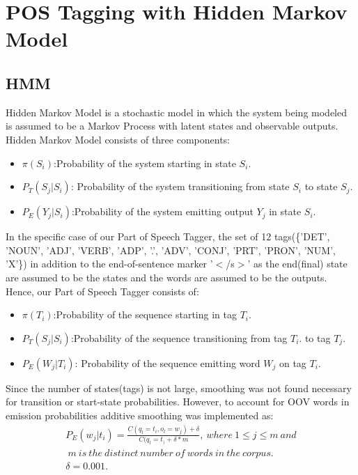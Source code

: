 \documentclass[12pt]{article}
\begin{document}
\section{POS Tagging with Hidden Markov Model}

\subsection{HMM}
Hidden Markov Model is a stochastic model in which the system being modeled is assumed to
be a Markov Process with latent states and observable outputs. Hidden Markov Model
consists of three components:
\begin{itemize}
 \item \textbf{$\pi(S_i)$}:Probability of the system starting in state $S_i$.
\item \textbf{$P_T(S_j|S_i)$}: Probability of the system transitioning from state $S_i$
 to state $S_j$.
\item \textbf{$P_E(Y_j|S_i)$}:Probability of the system emitting output  $Y_j$	
 in state $S_i$.
 \end{itemize}
In the specific case of our Part of Speech Tagger, the set of 12 tags(\{'DET', 'NOUN', 'ADJ', 'VERB', 'ADP', '.', 'ADV', 'CONJ', 'PRT', 'PRON', 'NUM', 'X'\}) in addition to the end-of-sentence marker '$<$/s$>$' as the end(final) state  are assumed to be the states and the
words are assumed to be the outputs. Hence, our Part of Speech Tagger consists of:
\begin{itemize}
 \item \textbf{$\pi(T_i)$}:Probability of the sequence starting in tag $T_i$.
\item \textbf{$P_T(S_j|S_i)$}:Probability of the sequence transitioning from tag $T_i$.
 to tag	$T_j$.
\item \textbf{$P_E(W_j|T_i)$}: Probability of the sequence emitting word  $W_j$	
 on tag $T_i$.
  \end{itemize}
  
 Since the number of states(tags) is not large, smoothing was not found necessary for transition or start-state probabilities. However, to account for OOV words in emission probabilities additive smoothing was implemented as:
 \begin{equation}
     \begin{split}
         P_E(w_j|t_i)=\frac{C(q_l=t_i,o_l=w_j)+\delta}{C(q_l=t_)+\delta *m},\: where\:1\leq  j \leq m \:and\\ \:m\: is \:the\: distinct \:number\: of \:words \:in \:the \:corpus.
         \\ \delta=0.001.
     \end{split}
 \end{equation}
\end{document}
